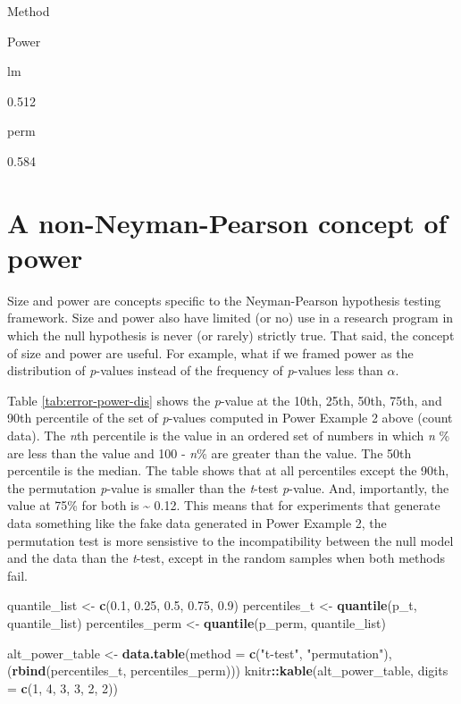 \documentclass[]{book}
\newenvironment{Shaded}{\begin{snugshade}}{\end{snugshade}}
\newcommand{\DataTypeTok}[1]{\textcolor[rgb]{0.13,0.29,0.53}{#1}}
\newcommand{\DecValTok}[1]{\textcolor[rgb]{0.00,0.00,0.81}{#1}}
\newcommand{\FloatTok}[1]{\textcolor[rgb]{0.00,0.00,0.81}{#1}}
\newcommand{\KeywordTok}[1]{\textcolor[rgb]{0.13,0.29,0.53}{\textbf{#1}}}
\newcommand{\NormalTok}[1]{#1}
\newcommand{\OperatorTok}[1]{\textcolor[rgb]{0.81,0.36,0.00}{\textbf{#1}}}
\newcommand{\StringTok}[1]{\textcolor[rgb]{0.31,0.60,0.02}{#1}}
\begin{document}
Method

Power

lm

0.512

perm

0.584

\hypertarget{a-non-neyman-pearson-concept-of-power}{%
\section{A non-Neyman-Pearson concept of power}\label{a-non-neyman-pearson-concept-of-power}}

Size and power are concepts specific to the Neyman-Pearson hypothesis testing framework. Size and power also have limited (or no) use in a research program in which the null hypothesis is never (or rarely) strictly true. That said, the concept of size and power are useful. For example, what if we framed power as the distribution of \emph{p}-values instead of the frequency of \emph{p}-values less than \(\alpha\).

Table \ref{tab:error-power-dis} shows the \emph{p}-value at the 10th, 25th, 50th, 75th, and 90th percentile of the set of \emph{p}-values computed in Power Example 2 above (count data). The \emph{n}th percentile is the value in an ordered set of numbers in which \emph{n} \% are less than the value and 100 - \emph{n}\% are greater than the value. The 50th percentile is the median. The table shows that at all percentiles except the 90th, the permutation \emph{p}-value is smaller than the \emph{t}-test \emph{p}-value. And, importantly, the value at 75\% for both is \textasciitilde{} 0.12. This means that for experiments that generate data something like the fake data generated in Power Example 2, the permutation test is more sensistive to the incompatibility between the null model and the data than the \emph{t}-test, except in the random samples when both methods fail.

\begin{Shaded}
\begin{Highlighting}[]
\NormalTok{quantile_list <-}\StringTok{ }\KeywordTok{c}\NormalTok{(}\FloatTok{0.1}\NormalTok{, }\FloatTok{0.25}\NormalTok{, }\FloatTok{0.5}\NormalTok{, }\FloatTok{0.75}\NormalTok{, }\FloatTok{0.9}\NormalTok{)}
\NormalTok{percentiles_t <-}\StringTok{ }\KeywordTok{quantile}\NormalTok{(p_t, quantile_list)}
\NormalTok{percentiles_perm <-}\StringTok{ }\KeywordTok{quantile}\NormalTok{(p_perm, quantile_list)}

\NormalTok{alt_power_table <-}\StringTok{ }\KeywordTok{data.table}\NormalTok{(}\DataTypeTok{method =} \KeywordTok{c}\NormalTok{(}\StringTok{"t-test"}\NormalTok{, }\StringTok{"permutation"}\NormalTok{),}
\NormalTok{                              (}\KeywordTok{rbind}\NormalTok{(percentiles_t,}
\NormalTok{                                     percentiles_perm)))}
\NormalTok{knitr}\OperatorTok{::}\KeywordTok{kable}\NormalTok{(alt_power_table, }\DataTypeTok{digits =} \KeywordTok{c}\NormalTok{(}\DecValTok{1}\NormalTok{, }\DecValTok{4}\NormalTok{, }\DecValTok{3}\NormalTok{, }\DecValTok{3}\NormalTok{, }\DecValTok{2}\NormalTok{, }\DecValTok{2}\NormalTok{))}
\end{Highlighting}
\end{Shaded}
\end{document}
